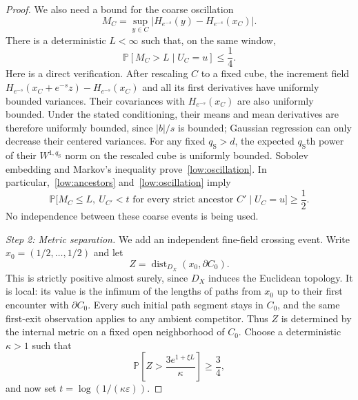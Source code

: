 \documentclass[11pt,letterpaper]{article}
\renewcommand{\P}{\mathbb P}
\newcommand{\eps}{\varepsilon}
\DeclareMathOperator{\dist}{dist}
\theoremstyle{definition}
\theoremstyle{remark}
\numberwithin{equation}{section}
\begin{document}
\begin{proof}
We also need a bound for the coarse oscillation
\begin{equation*}
    M_C=\sup_{y\in C}
       |H_{e^{-s}}(y)-H_{e^{-s}}(x_C)|.
\end{equation*}
There is a deterministic $L<\infty$ such that, on the same window,
\begin{equation}\label{low:oscillation}
    \P[M_C>L\mid U_C=u]\le\frac14.
\end{equation}
Here is a direct verification. After rescaling $C$ to a fixed cube, the increment field $H_{e^{-s}}(x_C+e^{-s}z)-H_{e^{-s}}(x_C)$ and all its first derivatives have uniformly bounded variances. Their covariances with $H_{e^{-s}}(x_C)$ are also uniformly bounded. Under the stated conditioning, their means and mean derivatives are therefore uniformly bounded, since $|b|/s$ is bounded; Gaussian regression can only decrease their centered variances. For any fixed $q_{\mathrm S}>d$, the expected $q_{\mathrm S}$th power of their $W^{1,q_{\mathrm S}}$ norm on the rescaled cube is uniformly bounded. Sobolev embedding and Markov's inequality prove~\eqref{low:oscillation}. In particular,~\eqref{low:ancestors} and~\eqref{low:oscillation} imply
\begin{equation}\label{low:coarse-good}
 \P\bigl[M_C\le L,\ U_{C'}<t\text{ for every strict ancestor }C'
               \mid U_C=u\bigr]\ge\frac12.
\end{equation}
No independence between these coarse events is being used.

\emph{Step 2: Metric separation.}
We add an independent fine-field crossing event. Write $x_0=(1/2,\ldots,1/2)$ and let
\begin{equation*}
    Z=\dist_{D_X}(x_0,\partial C_0).
\end{equation*}
This is strictly positive almost surely, since $D_X$ induces the Euclidean topology. It is local: its value is the infimum of the lengths of paths from $x_0$ up to their first encounter with $\partial C_0$. Every such initial path segment stays in $C_0$, and the same first-exit observation applies to any ambient competitor. Thus $Z$ is determined by the internal metric on a fixed open neighborhood of $C_0$. Choose a deterministic $\kappa>1$ such that
\begin{equation}\label{low:fine-positive}
    \P\left[Z>\frac{3e^{1+\xi L}}{\kappa}\right]\ge\frac34,
\end{equation}
and now set $t=\log(1/(\kappa\eps))$.


\end{proof}
\end{document}
